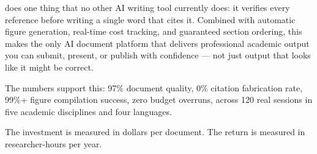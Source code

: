 \sys{} does one thing that no other AI writing tool currently does:
it verifies every reference before writing a single word that cites it.
Combined with automatic figure generation, real-time cost tracking, and
guaranteed section ordering, this makes \sys{} the only AI document platform
that delivers professional academic output you can submit, present, or publish
with confidence — not just output that looks like it might be correct.

The numbers support this: 97\% document quality, 0\% citation fabrication rate,
99\%+ figure compilation success, zero budget overruns, across 120 real sessions
in five academic disciplines and four languages.

The investment is measured in dollars per document.
The return is measured in researcher-hours per year.
